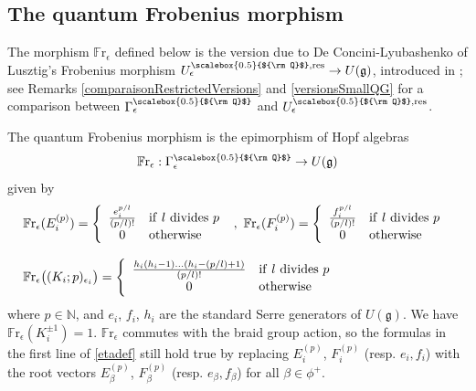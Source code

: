 \documentclass[11pt]{amsart}
\newcommand{\e}{\epsilon}
\newcommand{\mn}{\mathbb{N}}
\newcommand{\Q}{{\scalebox{0.5}{${\rm Q}$}}}
\begin{document}
\subsection{The quantum Frobenius morphism}\label{subsecDefFrobGamma} The morphism $\mathbb{F}\mathrm{r}_\e$ defined below is the version due to De Concini-Lyubashenko of Lusztig's Frobenius morphism $U_\e^{\Q,\mathrm{res}} \to U(\mathfrak{g})$, introduced in \cite{Lusztig1}; see Remarks \ref{comparaisonRestrictedVersions} and \ref{versionsSmallQG} for a comparison between $\Gamma_\e^\Q$ and $U_\e^{\Q,\mathrm{res}}$. 

The quantum Frobenius morphism is the epimorphism of Hopf algebras
\[ \mathbb{F}\mathrm{r}_\e :\Gamma_\e^\Q \to U(\mathfrak{g}) \]
given by \cite[Th.\,6.3]{DC-L}
\begin{equation}\label{etadef}
\begin{array}{l} \mathbb{F}\mathrm{r}_\e (E_i^{(p)}) = \left\lbrace\begin{array}{cl} \frac{e_i^{p/l}}{(p/l)!} & {\rm if}\ l \ {\rm divides}\ p\\ 0 & {\rm otherwise}\end{array}\right. \ ,\ \mathbb{F}\mathrm{r}_\e (F_i^{(p)}) = \left\lbrace\begin{array}{cl} \frac{f_i^{p/l}}{(p/l)!} & {\rm if}\ l \ {\rm divides}\ p\\ 0 & {\rm otherwise}\end{array}\right.\ \\ \\ \mathbb{F}\mathrm{r}_\e\bigl( (K_i;p)_{\e_i} \bigr) = \left\lbrace\begin{array}{cl} \frac{h_i(h_i-1)\ldots (h_i-(p/l)+1)}{(p/l)!} & {\rm if}\ l \ {\rm divides}\ p\\ 0 & {\rm otherwise}\end{array}\right.
\end{array}
\end{equation}
where $p\in \mn$, and $e_i$, $f_i$, $h_i$ are the standard Serre generators of $U(\mathfrak{g})$. We have $\mathbb{F}\mathrm{r}_\e(K_i^{\pm 1})=1$. $\mathbb{F}\mathrm{r}_\e$ commutes with the braid group action, so the formulas in the first line of \eqref{etadef} still hold true by replacing $E_i^{(p)}$, $F_i^{(p)}$ (resp. $e_i,f_i$) with the root vectors $E_\beta^{(p)}$, $F_\beta^{(p)}$ (resp. $e_\beta, f_\beta$) for all $\beta\in \phi^+$.
\end{document}
